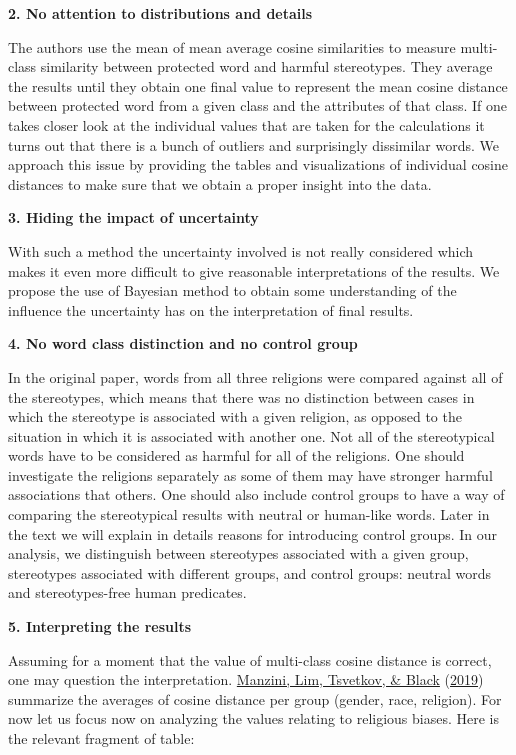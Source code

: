 \documentclass[
  12pt,
]{book}
\begin{document}
\textbf{2. No attention to distributions and details}

The authors use the mean of mean average cosine similarities to measure multi-class similarity between protected word and harmful stereotypes. They average the results until they obtain one final value to represent the mean cosine distance between protected word from a given class and the attributes of that class. If one takes closer look at the individual values that are taken for the calculations it turns out that there is a bunch of outliers and surprisingly dissimilar words. We approach this issue by providing the tables and visualizations of individual cosine distances to make sure that we obtain a proper insight into the data.

\textbf{3. Hiding the impact of uncertainty}

With such a method the uncertainty involved is not really considered which makes it even more difficult to give reasonable interpretations of the results. We propose the use of Bayesian method to obtain some understanding of the influence the uncertainty has on the interpretation of final results.

\pagebreak

\textbf{4. No word class distinction and no control group}

In the original paper, words from all three religions were compared against all of the stereotypes, which means that there was no distinction between cases in which the stereotype is associated with a given religion, as opposed to the situation in which it is associated with another one. Not all of the stereotypical words have to be considered as harmful for all of the religions. One should investigate the religions separately as some of them may have stronger harmful associations that others. One should also include control groups to have a way of comparing the stereotypical results with neutral or human-like words. Later in the text we will explain in details reasons for introducing control groups. In our analysis, we distinguish between stereotypes associated with a given group, stereotypes associated with different groups, and control groups: neutral words and stereotypes-free human predicates.

\textbf{5. Interpreting the results}

Assuming for a moment that the value of multi-class cosine distance is correct, one may question the interpretation. \protect\hyperlink{ref-Manzini2019blackToCriminal}{Manzini, Lim, Tsvetkov, \& Black} (\protect\hyperlink{ref-Manzini2019blackToCriminal}{2019}) summarize the averages of cosine distance per group (gender, race, religion). For now let us focus now on analyzing the values relating to religious biases. Here is the relevant fragment of table:
\end{document}

